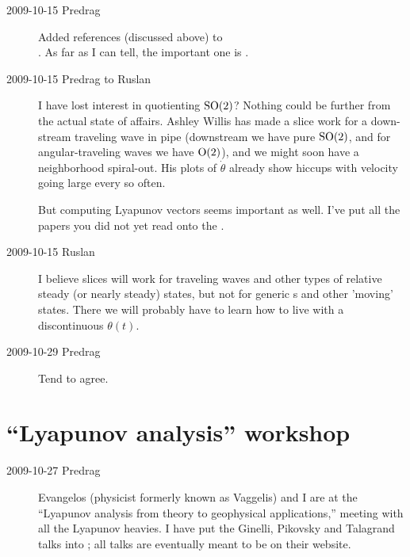 \begin{description}
\item[2009-10-15 Predrag]
Added references 
(discussed above) to
\\
. As far as I can tell, the important one is
.

\item[2009-10-15 Predrag to Ruslan]
I have lost interest in quotienting $\textrm{SO}(2)$? Nothing could
be further from the actual state of affairs. Ashley Willis
has made a slice work for a down-stream traveling wave in
pipe (downstream we have pure $\textrm{SO}(2)$, and for
angular-traveling waves we have $\textrm{O}(2)$), and we might soon have a
neighborhood spiral-out. His plots of $\dot{\theta}$ already
show hiccups with velocity going large every so often.

But computing Lyapunov vectors seems important as well. I've
put all the papers you did not yet read onto the
.

\item[2009-10-15 Ruslan]
I believe slices will work for traveling waves and other
types of relative steady (or nearly steady) states, but not
for generic \rpo s and other 'moving' states.  There we will
probably have to learn how to live with a discontinuous
$\theta(t)$.

\item[2009-10-29 Predrag] Tend to agree.

%
%
\end{description}

\section{``Lyapunov analysis'' workshop}
\label{iscpif}

\begin{description}

\item[2009-10-27 Predrag] Evangelos (physicist formerly known
as Vaggelis) and I are at the ``Lyapunov analysis from theory
to geophysical applications,''
 meeting with
all the Lyapunov heavies. I have put the Ginelli, Pikovsky and
Talagrand talks into ; all talks are eventually
meant to be on their website.
\end{description}

